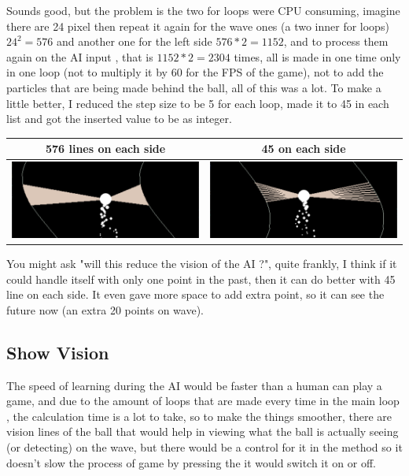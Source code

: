 Sounds good, but the problem is the two for loops were CPU consuming, imagine there are 24 pixel then repeat it again for the wave ones (a two inner for loops) $24^2 = 576$ and another one for the left side $576*2 = 1152$,  and to process them again on the AI input , that is $1152*2 = 2304$ times, all is made in one time only in one  loop (not to multiply it by 60 for the FPS of the game), not to add the particles that are being made behind the ball, all of this was a lot. To make a little better, I reduced the step size to be 5 for each loop, made it to 45 in each list and got the inserted value to be as integer.

\begin{table}[H]
	\centering
\begin{tabular}{|c|c|}
	\hline
	576 lines on each side	& 45 on each side \\ \hline
		\includegraphics[width=0.5\linewidth]{"usedImages/vision 576 lines"}& \includegraphics[width=0.5\linewidth]{"usedImages/vision 45 lines"} \\ \hline
	\end{tabular}
\end{table}

You might ask "will this reduce the vision of the AI ?", quite frankly, I think if it could handle itself with only one point in the past, then it can do better with 45 line on each side. It even gave more space to add extra point, so it can see the future now (an extra 20 points on wave).

\subsection{Show Vision}
The speed of learning during the AI would be faster than a human can play a game, and due to the amount of loops that are made every time in the main loop , the calculation time is a lot to take, so to make the things smoother, there are vision lines of the ball that would help in viewing what the ball is actually seeing (or detecting) on the wave, but there would be a control for it in the  method so it doesn't slow the process of game by pressing the  it would switch it on or off. 

